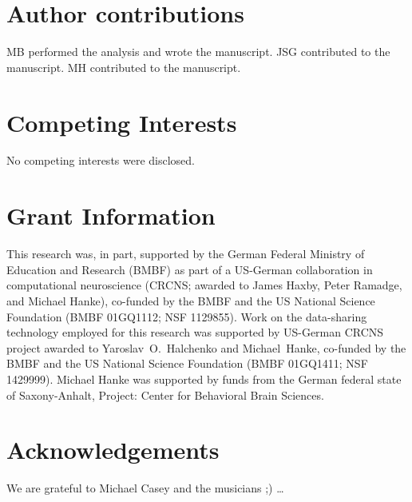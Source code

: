\section*{Author contributions}

MB performed the analysis and wrote the manuscript.
JSG contributed to the manuscript.
MH contributed to the manuscript.


\section*{Competing Interests}

No competing interests were disclosed.

\section*{Grant Information}

This research was, in part, supported by the German Federal Ministry of
Education and Research (BMBF) as part of a US-German collaboration in
computational neuroscience (CRCNS; awarded to James Haxby, Peter Ramadge, and
Michael Hanke), co-funded by the BMBF and the US National Science Foundation
(BMBF 01GQ1112; NSF 1129855).  Work on the data-sharing technology employed for
this research was supported by US-German CRCNS project awarded to
Yaroslav~O.~Halchenko and Michael~Hanke, co-funded by the BMBF and the US
National Science Foundation (BMBF 01GQ1411; NSF 1429999).  Michael Hanke was
supported by funds from the German federal state of Saxony-Anhalt, Project:
Center for Behavioral Brain Sciences.


\section*{Acknowledgements}

We are grateful to Michael Casey and the musicians ;) \ldots
{}





